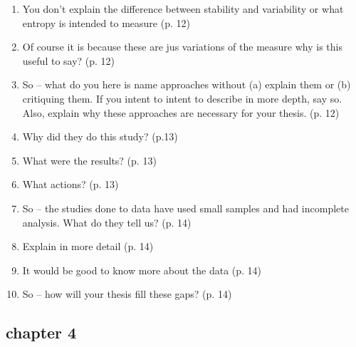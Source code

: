 \documentclass[10pt]{article}
\begin{document}
\begin{enumerate}[noitemsep,topsep=0pt]
\item You don't explain the difference between stability and variability
	or what entropy is intended to measure (p. 12)

\item Of course it is because these are jus variations of the measure 
	why is this useful to say? (p. 12)

\item So -- what do you here is name approaches without 
	(a) explain them or 
	(b) critiquing them.
	If you intent to intent to describe in more depth, say so.
	Also, explain why these approaches are necessary for 
	your thesis.
	(p. 12)

\item Why did they do this study? (p.13)

\item What were the results? (p. 13)

\item What actions? (p. 13)

\item So -- the studies done to data have used small samples 
	and had incomplete analysis.
	What do they tell us? (p. 14)

\item Explain in more detail (p. 14)

\item It would be good to know more about the data (p. 14)

\item So -- how will your thesis fill these gaps? (p. 14)

\end{enumerate}




\subsection{chapter 4}
\end{document}
